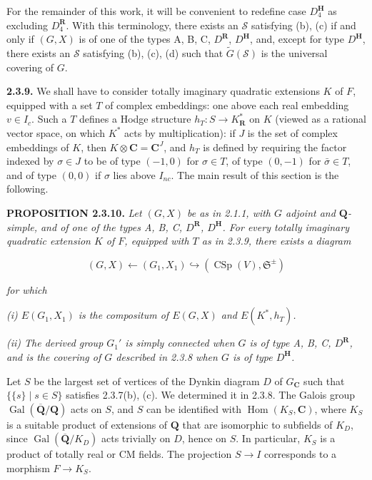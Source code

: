 \documentclass[10pt,a4paper]{article}
\begin{document}
For the remainder of this work, it will be convenient to redefine case \(D_4^{\mathbf H}\) as excluding \(D_4^{\mathbf R}\). With this terminology, there exists an \(\mathscr S\) satisfying (b), (c) if and only if \((G,X)\) is of one of the types A, B, C, \(D^{\mathbf R}\), \(D^{\mathbf H}\), and, except for type \(D^{\mathbf H}\), there exists an \(\mathscr S\) satisfying (b), (c), (d) such that \(\widetilde G(\mathscr S)\) is the universal covering of \(G\).

\textbf{2.3.9.} We shall have to consider totally imaginary quadratic extensions \(K\) of \(F\), equipped with a set \(T\) of complex embeddings: one above each real embedding \(v\in I_c\). Such a \(T\) defines a Hodge structure \(h_T:S\to K_{\mathbf R}^*\) on \(K\) (viewed as a rational vector space, on which \(K^*\) acts by multiplication): if \(J\) is the set of complex embeddings of \(K\), then \(K\otimes\mathbf C=\mathbf C^J\), and \(h_T\) is defined by requiring the factor indexed by \(\sigma\in J\) to be of type \((-1,0)\) for \(\sigma\in T\), of type \((0,-1)\) for \(\bar\sigma\in T\), and of type \((0,0)\) if \(\sigma\) lies above \(I_{nc}\). The main result of this section is the following.

\textbf{PROPOSITION 2.3.10.} \emph{Let \((G,X)\) be as in 2.1.1, with \(G\) adjoint and \(\mathbf Q\)-simple, and of one of the types A, B, C, \(D^{\mathbf R}\), \(D^{\mathbf H}\). For every totally imaginary quadratic extension \(K\) of \(F\), equipped with \(T\) as in 2.3.9, there exists a diagram}

\[
(G,X)\longleftarrow(G_1,X_1)\hookrightarrow(\operatorname{CSp}(V),\mathfrak S^{\pm})
\]

\emph{for which}

\emph{(i) \(E(G_1,X_1)\) is the compositum of \(E(G,X)\) and \(E(K^*,h_T)\).}

\emph{(ii) The derived group \(G_1'\) is simply connected when \(G\) is of type A, B, C, \(D^{\mathbf R}\), and is the covering of \(G\) described in 2.3.8 when \(G\) is of type \(D^{\mathbf H}\).}

Let \(S\) be the largest set of vertices of the Dynkin diagram \(D\) of \(G_{\mathbf C}\) such that \(\{\{s\}\mid s\in S\}\) satisfies 2.3.7(b), (c). We determined it in 2.3.8. The Galois group \(\operatorname{Gal}(\overline{\mathbf Q}/\mathbf Q)\) acts on \(S\), and \(S\) can be identified with \(\operatorname{Hom}(K_S,\mathbf C)\), where \(K_S\) is a suitable product of extensions of \(\mathbf Q\) that are isomorphic to subfields of \(K_D\), since \(\operatorname{Gal}(\overline{\mathbf Q}/K_D)\) acts trivially on \(D\), hence on \(S\). In particular, \(K_S\) is a product of totally real or CM fields. The projection \(S\to I\) corresponds to a morphism \(F\to K_S\).
\end{document}
